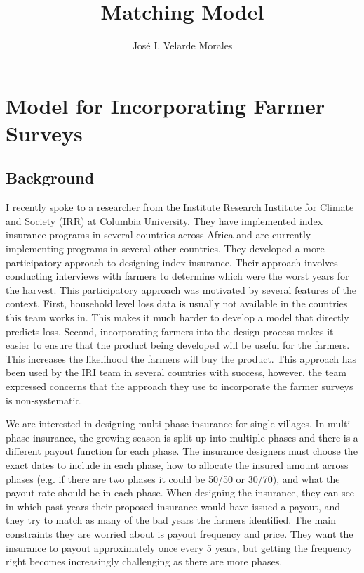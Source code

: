 \documentclass[11pt]{article}
\title{Matching Model}
\author{José I. Velarde Morales}
\begin{document}
\maketitle

\section{Model for Incorporating Farmer Surveys} \label{limited-data}
  \subsection{Background}
    I recently spoke to a researcher from the Institute Research Institute for Climate and Society (IRR) at Columbia University. They have implemented index insurance programs in several countries across Africa and are currently implementing programs in several other countries. They developed a more participatory approach to designing index insurance. Their approach involves conducting interviews with farmers to determine which were the worst years for the harvest. This participatory approach was motivated by several features of the context. First, household level loss data is usually not available in the countries this team works in. This makes it much harder to develop a model that directly predicts loss. Second, incorporating farmers into the design process makes it easier to ensure that the product being developed will be useful for the farmers. This increases the likelihood the farmers will buy the product. This approach has been used by the IRI team in several countries with success, however, the team expressed concerns that the approach they use to incorporate the farmer surveys is non-systematic. 

    We are interested in designing multi-phase insurance for single villages. In multi-phase insurance, the growing season is split up into multiple phases and there is a different payout function for each phase. The insurance designers must choose the exact dates to include in each phase, how to allocate the insured amount across phases (e.g. if there are two phases it could be 50/50 or 30/70), and what the payout rate should be in each phase. When designing the insurance, they can see in which past years their proposed insurance would have issued a payout, and they try to match as many of the bad years the farmers identified. The main constraints they are worried about is payout frequency and price. They want the insurance to payout approximately once every 5 years, but getting the frequency right becomes increasingly challenging as there are more phases.  
\end{document}
